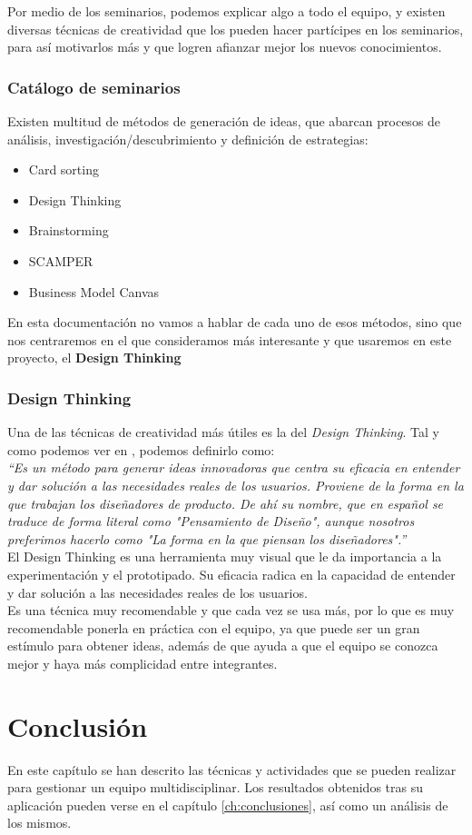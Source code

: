 Por medio de los seminarios, podemos explicar algo a todo el equipo, y existen diversas técnicas de creatividad que los pueden hacer partícipes en los seminarios, para así motivarlos más y que logren afianzar mejor los nuevos conocimientos.

\subsubsection{Catálogo de seminarios}
Existen multitud de métodos de generación de ideas, que abarcan procesos de análisis, investigación/descubrimiento y definición de estrategias:

\begin{itemize}
    \item Card sorting
    \item Design Thinking
    \item Brainstorming
    \item SCAMPER
    \item Business Model Canvas
\end{itemize}

En esta documentación no vamos a hablar de cada uno de esos métodos, sino que nos centraremos en el que consideramos más interesante y que usaremos en este proyecto, el \textbf{Design Thinking}

\subsubsection{Design Thinking}
Una de las técnicas de creatividad más útiles es la del \textit{Design Thinking}. Tal y como podemos ver en \cite{designthinkinglink}, podemos definirlo como:\\

\textit{``Es un método para generar ideas innovadoras que centra su eficacia en entender y dar solución a las necesidades reales de los usuarios. Proviene de la forma en la que trabajan los diseñadores de producto. De ahí su nombre, que en español se traduce de forma literal como "Pensamiento de Diseño", aunque nosotros preferimos hacerlo como "La forma en la que piensan los diseñadores".''}\\

El Design Thinking es una herramienta muy visual que le da importancia a la experimentación y el prototipado. Su eficacia radica en la capacidad de entender y dar solución a las necesidades reales de los usuarios.\\

Es una técnica muy recomendable y que cada vez se usa más, por lo que es muy recomendable ponerla en práctica con el equipo, ya que puede ser un gran estímulo para obtener ideas, además de que ayuda a que el equipo se conozca mejor y haya más complicidad entre integrantes.

\section{Conclusión}
En este capítulo se han descrito las técnicas y actividades que se pueden realizar para gestionar un equipo multidisciplinar. Los resultados obtenidos tras su aplicación pueden verse en el capítulo \ref{ch:conclusiones}, así como un análisis de los mismos.
